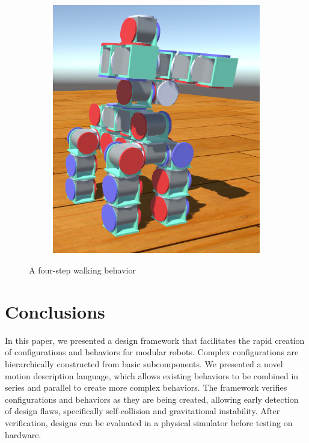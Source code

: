 \documentclass[graybox]{svmult}
\begin{document}
\begin{figure}
\begin{center}
\begin{subfigure}[b]{0.23\columnwidth}
                \caption{}
                \label{fig:step3}
           \end{subfigure}
        \begin{subfigure}[b]{0.23\columnwidth}
                \includegraphics[width=\textwidth]{images/library/unity/step4.png}
                \caption{}
                \label{fig:step4}
        \end{subfigure}
\end{center}
\caption{A four-step walking behavior}
\label{fig:walk}
\end{figure}


\section{Conclusions}
In this paper, we presented a design framework that facilitates the rapid creation
of configurations and behaviors for modular robots.
Complex configurations  are hierarchically constructed from basic
subcomponents.
We presented a novel motion description language, which allows existing behaviors
to be combined in series and parallel  to create more complex  behaviors.
The framework verifies  configurations and behaviors as they are being created, allowing
early detection of  design flaws, specifically self-collision and gravitational instability. After
verification, designs can be evaluated in a physical simulator before testing on
hardware.
\end{document}

